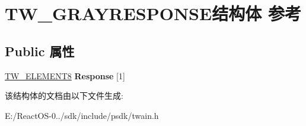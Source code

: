 \hypertarget{struct_t_w___g_r_a_y_r_e_s_p_o_n_s_e}{}\section{T\+W\+\_\+\+G\+R\+A\+Y\+R\+E\+S\+P\+O\+N\+S\+E结构体 参考}
\label{struct_t_w___g_r_a_y_r_e_s_p_o_n_s_e}
\subsection*{Public 属性}
\begin{DoxyCompactItemize}
\item 
\mbox{\label{struct_t_w___g_r_a_y_r_e_s_p_o_n_s_e_a6bc40b38dc0baaaed290d1ad3e96b251}} 
\hyperlink{struct_t_w___e_l_e_m_e_n_t8}{T\+W\+\_\+\+E\+L\+E\+M\+E\+N\+T8} {\bfseries Response} \mbox{[}1\mbox{]}
\end{DoxyCompactItemize}


该结构体的文档由以下文件生成\+:\begin{DoxyCompactItemize}
\item 
E\+:/\+React\+O\+S-\/0../sdk/include/psdk/twain.\+h\end{DoxyCompactItemize}
